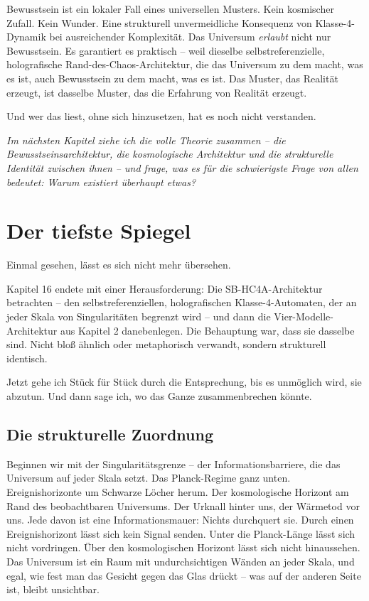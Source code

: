 \documentclass[11pt, twoside, openright]{book}
\begin{document}
Bewusstsein ist ein lokaler Fall eines universellen Musters. Kein kosmischer Zufall. Kein Wunder. Eine strukturell unvermeidliche Konsequenz von Klasse-4-Dynamik bei ausreichender Komplexität. Das Universum \textit{erlaubt} nicht nur Bewusstsein. Es garantiert es praktisch -- weil dieselbe selbstreferenzielle, holografische Rand-des-Chaos-Architektur, die das Universum zu dem macht, was es ist, auch Bewusstsein zu dem macht, was es ist. Das Muster, das Realität erzeugt, ist dasselbe Muster, das die Erfahrung von Realität erzeugt.

Und wer das liest, ohne sich hinzusetzen, hat es noch nicht verstanden.


\textit{Im nächsten Kapitel ziehe ich die volle Theorie zusammen -- die Bewusstseinsarchitektur, die kosmologische Architektur und die strukturelle Identität zwischen ihnen -- und frage, was es für die schwierigste Frage von allen bedeutet: Warum existiert überhaupt etwas?}

\chapter{Der tiefste Spiegel}

Einmal gesehen, lässt es sich nicht mehr übersehen.

Kapitel 16 endete mit einer Herausforderung: Die SB-HC4A-Architektur betrachten -- den selbstreferenziellen, holografischen Klasse-4-Automaten, der an jeder Skala von Singularitäten begrenzt wird -- und dann die Vier-Modelle-Architektur aus Kapitel 2 danebenlegen. Die Behauptung war, dass sie dasselbe sind. Nicht bloß ähnlich oder metaphorisch verwandt, sondern strukturell identisch.

Jetzt gehe ich Stück für Stück durch die Entsprechung, bis es unmöglich wird, sie abzutun. Und dann sage ich, wo das Ganze zusammenbrechen könnte.

\section*{Die strukturelle Zuordnung}

Beginnen wir mit der Singularitätsgrenze -- der Informationsbarriere, die das Universum auf jeder Skala setzt. Das Planck-Regime ganz unten. Ereignishorizonte um Schwarze Löcher herum. Der kosmologische Horizont am Rand des beobachtbaren Universums. Der Urknall hinter uns, der Wärmetod vor uns. Jede davon ist eine Informationsmauer: Nichts durchquert sie. Durch einen Ereignishorizont lässt sich kein Signal senden. Unter die Planck-Länge lässt sich nicht vordringen. Über den kosmologischen Horizont lässt sich nicht hinaussehen. Das Universum ist ein Raum mit undurchsichtigen Wänden an jeder Skala, und egal, wie fest man das Gesicht gegen das Glas drückt -- was auf der anderen Seite ist, bleibt unsichtbar.
\end{document}
